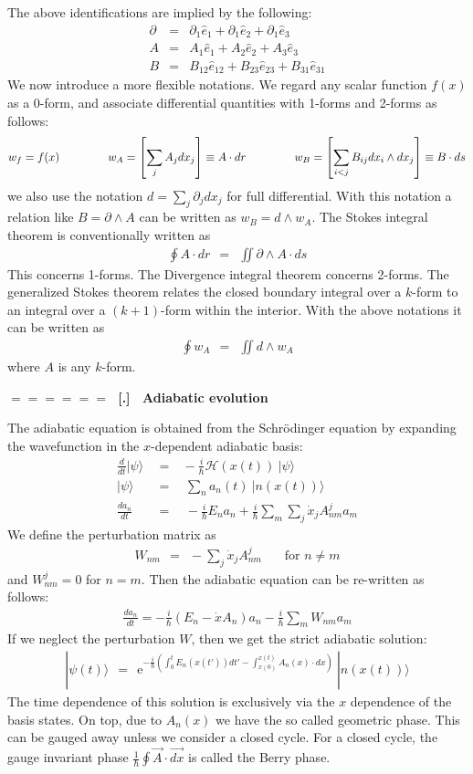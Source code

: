 \documentclass[onecolumn,fleqn]{revtex4}
\newcommand{\eexp}{\mathrm{e}^}
\newcommand{\beq}{\begin{eqnarray}}
\newcommand{\eeq}{\end{eqnarray}}
\renewcommand{\thesubsection}{\arabic{subsection}}
\renewcommand{\thesubsubsection}{\arabic{subsubsection}}
\newcommand{\sheadC}[1]
{
\addtocounter{subsubsection}{1}
\vspace{5mm}
{\Large\bf $=\!=\!=\!=\!=\!=\;$ [\thesubsection.\thesubsubsection] \ #1}  
\nopagebreak
\phantomsection
}
\begin{document}
The above identifications are implied by the following:
\beq
\partial &=& \partial_1\hat{e}_1+\partial_1\hat{e}_2+\partial_1\hat{e}_3
\\ \nonumber
A &=& A_1\hat{e}_1+A_2\hat{e}_2+A_3\hat{e}_3 
\\ \nonumber
B &=& B_{12} \hat{e}_{12}+B_{23} \hat{e}_{23}+B_{31} \hat{e}_{31}
\eeq
We now introduce a more flexible notations. We regard any scalar function $f(x)$ as a 0-form, 
and associate differential quantities with 1-forms and 2-forms as follows:
\beq 
w_f = f(x)
\hspace{15mm}
w_A = \left[\sum_j A_j dx_j\right] \equiv A \cdot dr
\hspace{15mm}     
w_B = \left[\sum_{i<j} B_{ij} dx_i \wedge dx_j\right] \equiv B \cdot ds
\eeq
we also use the notation $d= \sum_j \partial_j dx_j$ for full differential.
With this notation a relation like ${B=\partial \wedge A}$ 
can be written as  ${w_B=d \wedge w_A}$.
The Stokes integral theorem is conventionally written as 
\beq
\oint A \cdot dr \ \ = \ \ \iint\partial\wedge A\cdot ds
\eeq
This concerns 1-forms. 
The Divergence integral theorem concerns 2-forms.  
The generalized Stokes theorem relates the closed 
boundary integral over a $k$-form to an integral 
over a $(k{+}1)$-form within the interior. 
With the above notations it can be written as 
\beq
\oint w_A \ \ = \ \ \iint d \wedge w_A
\eeq
where $A$ is any $k$-form.


\sheadC{Adiabatic evolution}

The adiabatic equation is obtained from the
Schr\"{o}dinger equation by expanding the wavefunction
in the $x$-dependent adiabatic basis:
\beq
\frac{d}{dt}|\psi\rangle \ \ &=&
\  -\frac{i}{\hbar} {\mathcal{H}}(x(t)) \ |\psi\rangle
\\ \nonumber
|\psi\rangle \ \ &=& \ \ \sum_n a_n(t) \ |n(x(t))\rangle
\\ \nonumber
\frac{da_n}{dt} \ \ &=& \ \ -\frac{i}{\hbar} E_n a_n
+\frac{i}{\hbar} \sum_m \sum_j
\dot{x}_j A^{j}_{nm} a_m 
\eeq
We define the perturbation matrix as
\beq
W_{nm} \ \ = \ \ -\sum_j\dot{x}_j A^j_{nm}
\ \ \ \ \ \ \ \ \mbox{for $n\ne m$}
\eeq
and $W^{j}_{nm}=0$ for $n=m$.
Then the adiabatic equation can be re-written
as follows:
\beq
\frac{da_n}{dt} = -\frac{i}{\hbar} (E_n - \dot{x} A_n) a_n
-\frac{i}{\hbar} \sum_m
W_{nm} a_m
\eeq
If we neglect the perturbation $W$,
then we get the strict adiabatic solution:
\beq
| \psi(t) \rangle \ \ = \ \ 
\eexp{
-\frac{i}{\hbar} \left(
\int_0^t E_n(x(t'))dt'
-\int_{x(0)}^{x(t)} A_n(x)\cdot dx
\right)
}
\ |n(x(t))\rangle
\eeq
The time dependence of this solution is 
exclusively via the $x$ dependence of the  
basis states. On top, due to $A_n(x)$ we have 
the so called geometric phase.
This can be gauged away unless we consider a closed
cycle. For a closed cycle, the gauge invariant
phase $\frac{1}{\hbar} \oint \vec{A}\cdot \vec{dx}$ 
is called the Berry phase.
\end{document}
